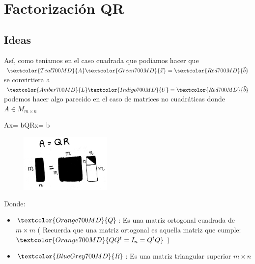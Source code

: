 \documentclass[12pt, fleqn]{report}                             %
\def \Eq {equation}                                             %
\newenvironment{MultiLineEquation*}[1]                          %
        {\begin{\Eq*}\begin{alignedat}{#1}}                         %
        {\end{alignedat}\end{\Eq*}}                                 %
\newenvironment{LargeEq} {\begingroup \Large}{\endgroup}        %
\DeclareMathOperator \Space     {\quad}                         %
\theoremstyle{break}                                            %
\newcommand \lLongTo {\longrightarrow}                          %
\newcommand{\Color}[2]{\textcolor{#1}{#2}}                      %
\newcommand \ColorMatrixA       {Teal700MD}                     %
\newcommand \ColorVecX          {Green700MD}                    %
\newcommand \ColorVecB          {Red700MD}                      %
\newcommand \ColorMatrixL       {Amber700MD}                    %
\newcommand \ColorMatrixU       {Indigo700MD}                   %
\newcommand \ColorMatrixQ       {Orange700MD}                   %
\newcommand \ColorMatrixR       {BlueGrey700MD}                 %
\newcommand \MatrixA      {\Color{\ColorMatrixA}{A}}            %
\newcommand \VecX         {\Color{\ColorVecX}{\vec x}}          %
\newcommand \VecB         {\Color{\ColorVecB}{\vec b}}          %
\newcommand \MatrixL      {\Color{\ColorMatrixL}{L}}            %
\newcommand \MatrixU      {\Color{\ColorMatrixU}{U}}            %
\newcommand \MatrixQ      {\Color{\ColorMatrixQ}{Q}}            %
\newcommand \MatrixR      {\Color{\ColorMatrixR}{R}}            %
\begin{document}
    \chapter{Factorización QR}

        \clearpage
        \section{Ideas}

            Así, como teniamos en el caso cuadrada que podiamos hacer que $\MatrixA \VecX = \VecB$
            se convirtiera a $\MatrixL \MatrixU = \VecB$ podemos hacer algo parecido en el caso
            de matrices no cuadráticas donde $A \in M_{m \times n}$
            \begin{LargeEq}
                \begin{MultiLineEquation*}{3}
                    \MatrixA \VecX = \VecB \Space \lLongTo \Space \MatrixQ \MatrixR \VecX = \VecB               
                \end{MultiLineEquation*}
            \end{LargeEq}
            \begin{figure}[h]
                \includegraphics[width=0.4\textwidth]{AQR}
            \end{figure}

            Donde:
            \begin{itemize}
                \item $\MatrixQ$: Es una matriz ortogonal cuadrada de $m \times m$ 
                    (
                        Recuerda que una matriz ortogonal es aquella matriz que cumple:
                        $\Color{ \ColorMatrixQ }{Q Q^t = I_n = Q^t Q}$    
                    )
                \item $\MatrixR$: Es una matriz triangular superior $m \times n$
            \end{itemize}
\end{document}
